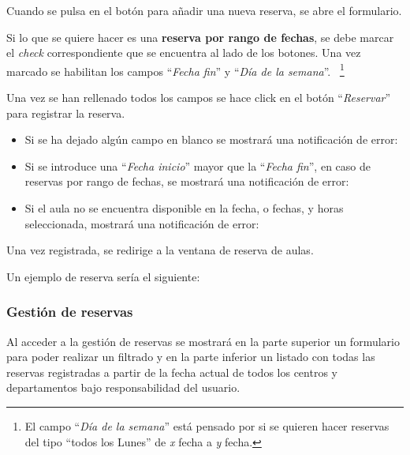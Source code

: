 Cuando se pulsa en el botón para añadir una nueva reserva, se abre el formulario.


Si lo que se quiere hacer es una \textbf{reserva por rango de fechas}, se debe marcar el \textit{check} correspondiente que se encuentra al lado de los botones. Una vez marcado se habilitan los campos ``\textit{Fecha fin}'' y ``\textit{Día de la semana}''. ~\footnote{El campo ``\textit{Día de la semana}'' está pensado por si se quieren hacer reservas del tipo ``todos los Lunes'' de \textit{x} fecha a \textit{y} fecha.}


Una vez se han rellenado todos los campos se hace click en el botón ``\textit{Reservar}'' para registrar la reserva.

\begin{itemize}
    \item Si se ha dejado algún campo en blanco se mostrará una notificación de error:
    
    
     \item Si se introduce una ``\textit{Fecha inicio}'' mayor que la ``\textit{Fecha fin}'', en caso de reservas por rango de fechas, se mostrará una notificación de error:
    
    
    \item Si el aula no se encuentra disponible en la fecha, o fechas, y horas seleccionada, mostrará una notificación de error:
    
\end{itemize}

Una vez registrada, se redirige a la ventana de reserva de aulas.

Un ejemplo de reserva sería el siguiente:


\subsubsection{Gestión de reservas}
Al acceder a la gestión de reservas se mostrará en la parte superior un formulario para poder realizar un filtrado y en la parte inferior un listado con todas las reservas registradas a partir de la fecha actual de todos los centros y departamentos bajo responsabilidad del usuario.

